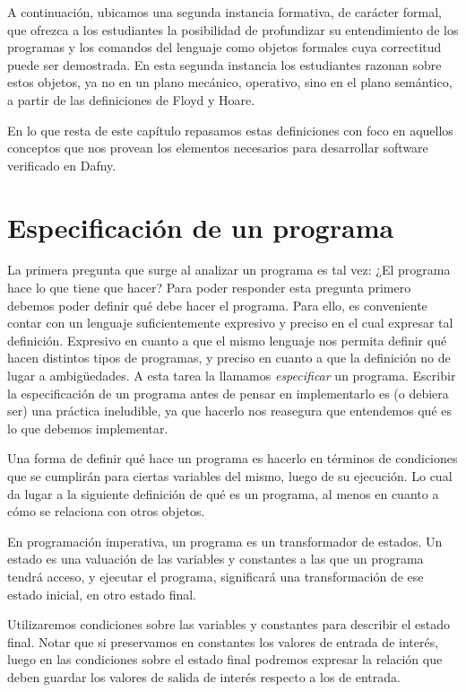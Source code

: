 \documentclass[12pt, a4paper, openany, fleqn]{book}
\begin{document}
    A continuación, ubicamos una segunda instancia formativa, de carácter formal, que ofrezca a los estudiantes la posibilidad de profundizar su entendimiento de los programas y los comandos del lenguaje como objetos formales cuya correctitud puede ser demostrada.
    En esta segunda instancia los estudiantes razonan sobre estos objetos, ya no en un plano mecánico, operativo, sino en el plano semántico, a partir de las definiciones de Floyd y Hoare.

    En lo que resta de este capítulo repasamos estas definiciones con foco en aquellos conceptos que nos provean los elementos necesarios para desarrollar software verificado en Dafny.

    \section{Especificación de un programa}
    La primera pregunta que surge al analizar un programa es tal vez: ¿El programa hace lo que tiene que hacer? Para poder responder esta pregunta primero debemos poder definir qué debe hacer el programa. Para ello, es conveniente contar con un lenguaje suficientemente expresivo y preciso en el cual expresar tal definición. Expresivo en cuanto a que el mismo lenguaje nos permita definir qué hacen distintos tipos de programas, y preciso en cuanto a que la definición no de lugar a ambigüedades.
    A esta tarea la llamamos \textit{especificar} un programa. Escribir la especificación de un programa antes de pensar en implementarlo es (o debiera ser) una práctica ineludible, ya que hacerlo nos reasegura que entendemos qué es lo que debemos implementar.

    Una forma de definir qué hace un programa es hacerlo en términos de condiciones que se cumplirán para ciertas variables del mismo, luego de su ejecución. Lo cual da lugar a la siguiente definición de qué es un programa, al menos en cuanto a cómo se relaciona con otros objetos.

    En programación imperativa, un programa es un transformador de estados. Un estado es una valuación de las variables y constantes a las que un programa tendrá acceso, y ejecutar el programa, significará una transformación de ese estado inicial, en otro estado final.

    Utilizaremos condiciones sobre las variables y constantes para describir el estado final.
    Notar que si preservamos en constantes los valores de entrada de interés, luego en las condiciones sobre el estado final podremos expresar la relación que deben guardar los valores de salida de interés respecto a los de entrada.
\end{document}

